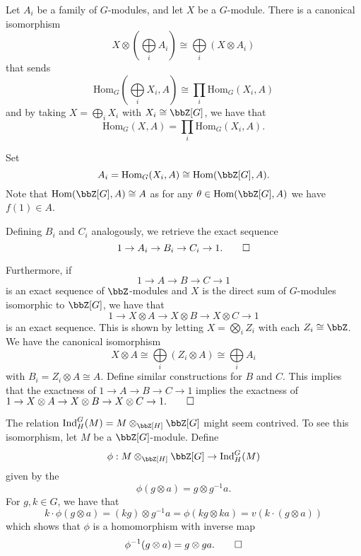 \documentclass[a4paper, 12pt,oneside,openany]{book}
\begin{document}
 Let $A_i$ be a family of $G$-modules, and let $X$ be a $G$-module. There is a canonical isomorphism $$X \otimes (\bigoplus\limits_i A_i) \cong \bigoplus\limits_i (X \otimes A_i)$$ that sends $$\text{Hom}_G(\bigoplus\limits_i X_i, A) \cong \prod\limits_i \text{Hom}_G(X_i, A)$$ and by taking $X = \bigoplus\limits_i X_i$ with $X_i \cong \bbZ[G]$, we have that $$\text{Hom}_G(X, A) = \prod\limits_i \text{Hom}_G(X_i, A).$$

Set $$A_i = \text{Hom}_G(X_i, A) \cong \text{Hom}(\bbZ[G], A).$$ Note that $\text{Hom}(\bbZ[G], A) \cong A$ as for any $\theta \in \text{Hom}(\bbZ[G], A)$ we have $f(1) \in A$. 

Defining $B_i$ and $C_i$ analogously, we retrieve the exact sequence $$1 \to A_i \to B_i \to C_i \to 1. \qed$$

Furthermore, if $$1 \to A \to B \to C \to 1$$ is an exact sequence of $\bbZ$-modules and $X$ is the direct sum of $G$-modules isomorphic to $\bbZ[G]$, we have that $$1 \to X \otimes A \to X \otimes B \to X\otimes C \to 1$$ is an exact sequence. This is shown by letting $X = \bigotimes\limits_i Z_i$ with each $Z_i \cong \bbZ$. We have the canonical isomorphism $$X \otimes A \cong \bigoplus\limits_i (Z_i \otimes A) \cong \bigoplus\limits_i A_i$$ with $B_i = Z_i \otimes A \cong A$. Define similar constructions for $B$ and $C$. This implies that the exactness of $1 \to A \to B \to C \to 1$ implies the exactness of $1 \to X \otimes A \to X \otimes B \to X\otimes C \to 1. \qed$


The relation $\text{Ind}_H^G(M) = M\otimes_{\bbZ[H]} \bbZ[G]$ might seem contrived. To see this isomorphism, let $M$ be a $\bbZ[G]$-module. Define $$\phi: M\otimes_{\bbZ[H]} \bbZ[G] \to \text{Ind}_H^G(M)$$ given by the $$\phi(g \otimes a)= g \otimes g^{-1}a.$$ For $g, k \in G$, we have that $$k \cdot \phi(g \otimes a) = (kg) \otimes g^{-1} a = \phi(kg \otimes ka) = v(k \cdot(g \otimes a))$$ which shows that $\phi$ is a homomorphism with inverse map $$\phi^{-1}(g\otimes a ) = g \otimes ga. \qed$$
\end{document}
